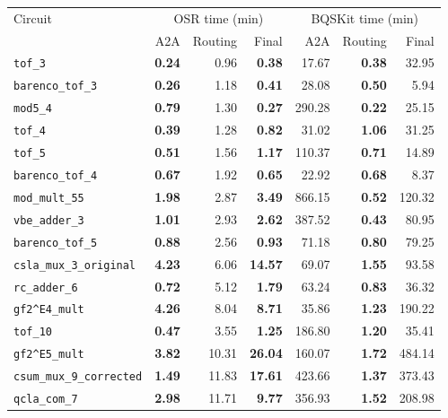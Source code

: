 \begin{table}[p]
\centering
\scriptsize
\begin{tabular}{l|rrr|rrr}
\hline
Circuit & \multicolumn{3}{c|}{OSR time (min)} & \multicolumn{3}{c}{BQSKit time (min)} \\
 & A2A & Routing & Final & A2A & Routing & Final \\
\hline
\texttt{tof\_3} & \textbf{0.24} & 0.96 & \textbf{0.38} & 17.67 & \textbf{0.38} & 32.95 \\
\texttt{barenco\_tof\_3} & \textbf{0.26} & 1.18 & \textbf{0.41} & 28.08 & \textbf{0.50} & 5.94 \\
\texttt{mod5\_4} & \textbf{0.79} & 1.30 & \textbf{0.27} & 290.28 & \textbf{0.22} & 25.15 \\
\texttt{tof\_4} & \textbf{0.39} & 1.28 & \textbf{0.82} & 31.02 & \textbf{1.06} & 31.25 \\
\texttt{tof\_5} & \textbf{0.51} & 1.56 & \textbf{1.17} & 110.37 & \textbf{0.71} & 14.89 \\
\texttt{barenco\_tof\_4} & \textbf{0.67} & 1.92 & \textbf{0.65} & 22.92 & \textbf{0.68} & 8.37 \\
\texttt{mod\_mult\_55} & \textbf{1.98} & 2.87 & \textbf{3.49} & 866.15 & \textbf{0.52} & 120.32 \\
\texttt{vbe\_adder\_3} & \textbf{1.01} & 2.93 & \textbf{2.62} & 387.52 & \textbf{0.43} & 80.95 \\
\texttt{barenco\_tof\_5} & \textbf{0.88} & 2.56 & \textbf{0.93} & 71.18 & \textbf{0.80} & 79.25 \\
\texttt{csla\_mux\_3\_original} & \textbf{4.23} & 6.06 & \textbf{14.57} & 69.07 & \textbf{1.55} & 93.58 \\
\texttt{rc\_adder\_6} & \textbf{0.72} & 5.12 & \textbf{1.79} & 63.24 & \textbf{0.83} & 36.32 \\
\texttt{gf2\textasciicircum{}E4\_mult} & \textbf{4.26} & 8.04 & \textbf{8.71} & 35.86 & \textbf{1.23} & 190.22 \\
\texttt{tof\_10} & \textbf{0.47} & 3.55 & \textbf{1.25} & 186.80 & \textbf{1.20} & 35.41 \\
\texttt{gf2\textasciicircum{}E5\_mult} & \textbf{3.82} & 10.31 & \textbf{26.04} & 160.07 & \textbf{1.72} & 484.14 \\
\texttt{csum\_mux\_9\_corrected} & \textbf{1.49} & 11.83 & \textbf{17.61} & 423.66 & \textbf{1.37} & 373.43 \\
\texttt{qcla\_com\_7} & \textbf{2.98} & 11.71 & \textbf{9.77} & 356.93 & \textbf{1.52} & 208.98 \\

\end{tabular}
\end{table}
